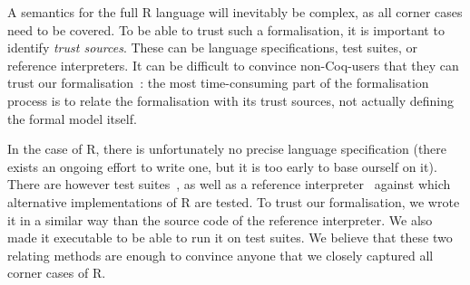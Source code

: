 \documentclass[9pt, sigplan, natbib=false, screen=true]{acmart}
\newcommand\Coq{Coq}
\newcommand\R{R}
\begin{document}
A semantics for the full \R{} language will inevitably be complex,
as all corner cases need to be covered.
%
To be able to trust such a formalisation,
it is important to identify \emph{trust sources}.
These can be language specifications,
test suites,
or reference interpreters.
%
It can be difficult to convince non-\Coq{}-users
that they can trust our formalisation~\parencite{leroy2014pip}:
the most time-consuming part of the formalisation process is to
relate the formalisation with its trust sources,
not actually defining the formal model itself.




In the case of \R{}, there is unfortunately
no precise language specification
(there exists an ongoing effort to write one,
but it is too early to base ourself on it).
There are however test suites~\parencite{2014testr, maj2013testr},
as well as a reference interpreter~\parencite{Rwebsite}
against which alternative implementations of \R{} are tested.
%
To trust our formalisation, we wrote it in a similar
way than the source code of the reference interpreter.
We also made it executable to be able to run it on test suites.
We believe that these two relating methods are enough
to convince anyone that we closely captured all corner cases of \R{}.
\end{document}
